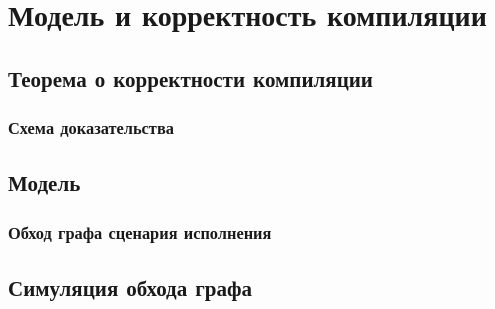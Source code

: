 \chapter{Модель \Wkm и корректность компиляции}
\label{ch:weakestmo-imm}

\section{Теорема о корректности компиляции}

\subsection{Схема доказательства}

\section{Модель \IMM}

\subsection{Обход графа сценария исполнения}

\section{Симуляция обхода графа \IMM}
